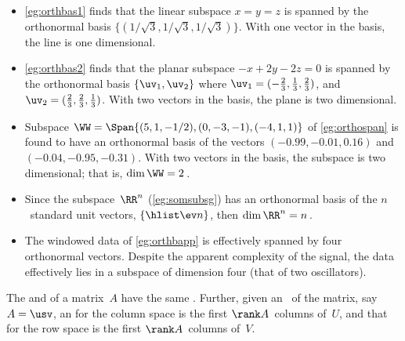 \begin{example} \label{eg:}
\begin{itemize}
\item \autoref{eg:orthbas1} finds that the linear subspace \(x=y=z\) is spanned by the orthonormal basis \(\{(1/{\sqrt3},1/{\sqrt3},1/{\sqrt3})\}\).  
With one vector in the basis, the line is one dimensional.

\item \autoref{eg:orthbas2} finds that the planar subspace \(-x+2y-2z=0\) is spanned by the orthonormal basis \(\{\uv_1,\uv_2\}\) where \(\uv_1=(-\frac23,\frac13,\frac23)\), and \(\uv_2=(\frac23,\frac23,\frac13)\).  
With two vectors in the basis, the plane is two dimensional.

\item  Subspace \(\WW=\Span\{(5,1,-1/2),(0,-3,-1),(-4,1,1)\}\) of \autoref{eg:orthospan} is found to have an orthonormal basis of the vectors  \((-0.99,-0.01,0.16)\) and \((-0.04,-0.95,-0.31)\).
With two vectors in the basis, the subspace is two dimensional; that is, \(\dim\WW=2\)\,.

\item Since the subspace~\(\RR^n\) (\autoref{eg:somsubsg}) has an orthonormal basis of the \(n\)~standard unit vectors, \(\{\hlist\ev n\}\), then  \(\dim\RR^n=n\)\,.

\item The  windowed data of \autoref{eg:orthbapp} is effectively spanned by four orthonormal vectors.  Despite the apparent complexity of the signal, the data effectively lies in a subspace of dimension four (that of two oscillators).
\end{itemize}
\end{example}


\begin{theorem} \label{thm:rowcolD} 
The  and  of a matrix~\(A\) have the same .
Further, given an \svd\ of the matrix, say \(A=\usv\), an  for the column space is the first \(\rank A\)~columns of~\(U\), and that for the row space is the first \(\rank A\)~columns of~\(V\).
\end{theorem}

